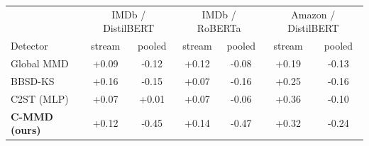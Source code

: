 \setlength{\tabcolsep}{2.5pt}\renewcommand{\arraystretch}{1.0}%
\begin{tabular}{lcccccc}
\toprule
 & \multicolumn{2}{c}{IMDb / DistilBERT} & \multicolumn{2}{c}{IMDb / RoBERTa} & \multicolumn{2}{c}{Amazon / DistilBERT} \\
\cmidrule(lr){2-3}\cmidrule(lr){4-5}\cmidrule(lr){6-7}
Detector & stream & pooled & stream & pooled & stream & pooled \\
\midrule
Global MMD & \makecell{+0.09\\{\cifont[-0.03, +0.21]}} & \makecell{-0.12\\{\cifont[-0.16, -0.08]}} & \makecell{+0.12\\{\cifont[+0.01, +0.23]}} & \makecell{-0.08\\{\cifont[-0.12, -0.04]}} & \makecell{+0.19\\{\cifont[-0.21, +0.54]}} & \makecell{-0.13\\{\cifont[-0.18, -0.08]}} \\
BBSD-KS & \makecell{+0.16\\{\cifont[+0.06, +0.27]}} & \makecell{-0.15\\{\cifont[-0.19, -0.11]}} & \makecell{+0.07\\{\cifont[-0.03, +0.18]}} & \makecell{-0.16\\{\cifont[-0.20, -0.12]}} & \makecell{+0.25\\{\cifont[-0.17, +0.64]}} & \makecell{-0.16\\{\cifont[-0.21, -0.12]}} \\
C2ST (MLP) & \makecell{+0.07\\{\cifont[-0.04, +0.18]}} & \makecell{+0.01\\{\cifont[-0.02, +0.05]}} & \makecell{+0.07\\{\cifont[-0.04, +0.18]}} & \makecell{-0.06\\{\cifont[-0.10, -0.02]}} & \makecell{+0.36\\{\cifont[-0.04, +0.65]}} & \makecell{-0.10\\{\cifont[-0.15, -0.05]}} \\
\textbf{C-MMD (ours)} & \makecell{+0.12\\{\cifont[+0.01, +0.22]}} & \makecell{-0.45\\{\cifont[-0.49, -0.42]}} & \makecell{+0.14\\{\cifont[+0.04, +0.24]}} & \makecell{-0.47\\{\cifont[-0.51, -0.43]}} & \makecell{+0.32\\{\cifont[-0.10, +0.65]}} & \makecell{-0.24\\{\cifont[-0.29, -0.18]}} \\

\end{tabular}
